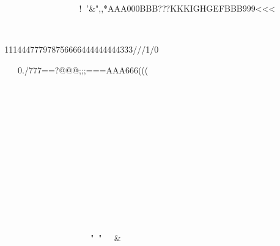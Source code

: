 































	
		










												

		

 !'&",,*AAA000BBB???KKKIGHGEFBBB999<<<




                                                                                                                        


111444777978756666444444444333///1/0


				0./777==?@@@;;;===AAA666(((









			
























	











			
			

	




	
														
"" &%


                                                                                                                           			


